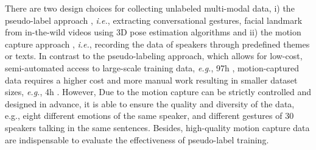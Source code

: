 \documentclass[runningheads]{llncs}
\begin{document}
There are two design choices for collecting unlabeled multi-modal data, i) the pseudo-label approach \cite{ginosar2019learning,yoon2020speech,habibie2021learning}, \textit{i.e.}, extracting conversational gestures, facial landmark from in-the-wild videos using 3D pose estimation algorithms \cite{cao2019openpose} and ii) the motion capture approach \cite{ferstl2018investigating}, \textit{i.e.}, recording the data of speakers through predefined themes or texts. In contrast to the pseudo-labeling approach, which allows for low-cost, semi-automated access to large-scale training data, \textit{e.g.}, 97h \cite{yoon2020speech}, motion-captured data requires a higher cost and more manual work resulting in smaller dataset sizes, \textit{e.g.}, 4h \cite{ferstl2018investigating}. However, Due to the motion capture can be strictly controlled and designed in advance, it is able to ensure the quality and diversity of the data, e.g., eight different emotions of the same speaker, and different gestures of 30 speakers talking in the same sentences. Besides, high-quality motion capture data are indispensable to evaluate the effectiveness of pseudo-label training. 
\end{document}
